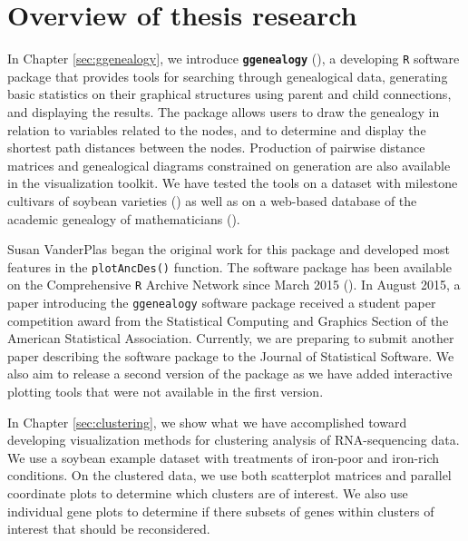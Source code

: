 \documentclass[11pt,a4paper,oldfontcommands,openany]{memoir}
\numberwithin{equation}{section} %
\newcommand{\code}[1]{{\texttt{#1}}}
\newcommand{\pkg}[1]{{\texttt{#1}}}
\begin{document}
\section{Overview of thesis research}


In Chapter \ref{sec:ggenealogy}, we introduce \textbf{\pkg{ggenealogy}} (\citealt{ggen}), a developing \pkg{R} software package that provides tools for searching through genealogical data, generating basic statistics on their graphical structures using parent and child connections, and displaying the results. The package allows users to draw the genealogy in relation to variables related to the nodes, and to determine and display the shortest path distances between the nodes. Production of pairwise distance matrices and genealogical diagrams constrained on generation are also available in the visualization toolkit. We have tested the tools on a dataset with milestone cultivars of soybean varieties (\citealt{soybean}) as well as on a web-based database of the academic genealogy of mathematicians (\citealt{mgp}).

Susan VanderPlas began the original work for this package and developed most features in the \code{plotAncDes()} function. The software package has been available on the Comprehensive \pkg{R} Archive Network since March 2015 (\citealt{ggen}). In August 2015, a paper introducing the \pkg{ggenealogy} software package received a student paper competition award from the Statistical Computing and Graphics Section of the American Statistical Association. Currently, we are preparing to submit another paper describing the software package to the Journal of Statistical Software. We also aim to release a second version of the package as we have added interactive plotting tools that were not available in the first version.

In Chapter \ref{sec:clustering}, we show what we have accomplished toward developing visualization methods for clustering analysis of RNA-sequencing data. We use a soybean example dataset with treatments of iron-poor and iron-rich conditions. On the clustered data, we use both scatterplot matrices and parallel coordinate plots to determine which clusters are of interest. We also use individual gene plots to determine if there subsets of genes within clusters of interest that should be reconsidered.
\end{document}
